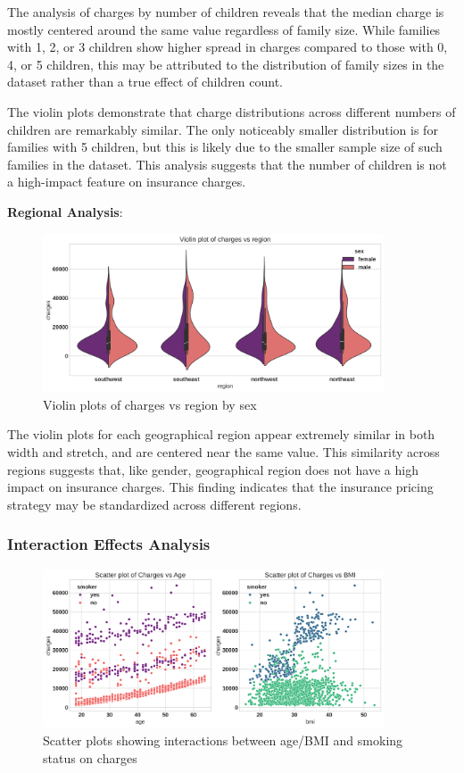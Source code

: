 \documentclass[12pt,a4paper]{article}
\begin{document}
The analysis of charges by number of children reveals that the median charge is mostly centered around the same value regardless of family size. While families with 1, 2, or 3 children show higher spread in charges compared to those with 0, 4, or 5 children, this may be attributed to the distribution of family sizes in the dataset rather than a true effect of children count.

The violin plots demonstrate that charge distributions across different numbers of children are remarkably similar. The only noticeably smaller distribution is for families with 5 children, but this is likely due to the smaller sample size of such families in the dataset. This analysis suggests that the number of children is not a high-impact feature on insurance charges.

\textbf{Regional Analysis}:

\begin{figure}[H]
\centering
\includegraphics[width=0.9\textwidth]{violin_plot_charges_vs_region_by_sex.png}
\caption{Violin plots of charges vs region by sex}
\label{fig:violin_plot_charges_vs_region_by_sex}
\end{figure}

The violin plots for each geographical region appear extremely similar in both width and stretch, and are centered near the same value. This similarity across regions suggests that, like gender, geographical region does not have a high impact on insurance charges. This finding indicates that the insurance pricing strategy may be standardized across different regions.

\subsubsection{Interaction Effects Analysis}

\begin{figure}[H]
\centering
\includegraphics[width=0.9\textwidth]{scatter_plots_charges_vs_age_bmi.png}
\caption{Scatter plots showing interactions between age/BMI and smoking status on charges}
\label{fig:scatter_plots_charges_vs_age_bmi}
\end{figure}
\end{document}
